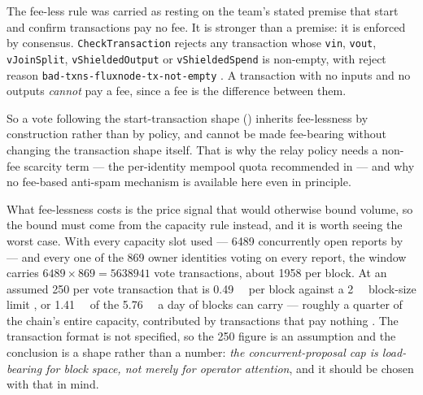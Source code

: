 \begin{remark}
\label{rem:feeless-verified}
The fee-less rule was carried as resting on the team's stated premise that \FluxNode{} start and
confirm transactions pay no fee. It is stronger than a premise: it is enforced by consensus.
\texttt{Check\allowbreak{}Transaction} rejects any \FluxNode{} transaction whose \texttt{vin}, \texttt{vout},
\texttt{vJoinSplit}, \texttt{v\allowbreak{}Shielded\allowbreak{}Output} or \texttt{vShieldedSpend} is non-empty, with reject
reason \texttt{bad-\allowbreak{}txns-\allowbreak{}fluxnode-\allowbreak{}tx-\allowbreak{}not-\allowbreak{}empty} \shipped
{}. A transaction with no inputs and no outputs
\emph{cannot} pay a fee, since a fee is the difference between them.

So a vote following the start-transaction shape () inherits fee-lessness by
construction rather than by policy, and cannot be made fee-bearing without changing the transaction
shape itself. That is why the relay policy needs a non-fee scarcity term --- the per-identity mempool
quota recommended in  --- and why no fee-based anti-spam mechanism is
available here even in principle.
\end{remark}

What fee-lessness costs is the price signal that would otherwise bound volume, so the bound must
come from the capacity rule instead, and it is worth seeing the worst case. With every capacity
slot used --- \num{6489} concurrently open reports by  --- and every one of
the \num{869} owner identities voting on every report, the window carries
$\num{6489} \times \num{869} = \num{5638941}$ vote transactions, about \num{1958} per block. At an
assumed \SI{250}{\byte} per vote transaction that is \SI{0.49}{\mega\byte} per block against a
\SI{2}{\mega\byte} block-size limit , or
\SI{1.41}{\giga\byte} of the \SI{5.76}{\giga\byte} a day of blocks can carry --- roughly a quarter
of the chain's entire capacity, contributed by transactions that pay nothing \srcinferred. The
transaction format is not specified, so the \SI{250}{\byte} figure is an assumption and the
conclusion is a shape rather than a number: \emph{the concurrent-proposal cap is load-bearing for
block space, not merely for operator attention}, and it should be chosen with that in mind.

